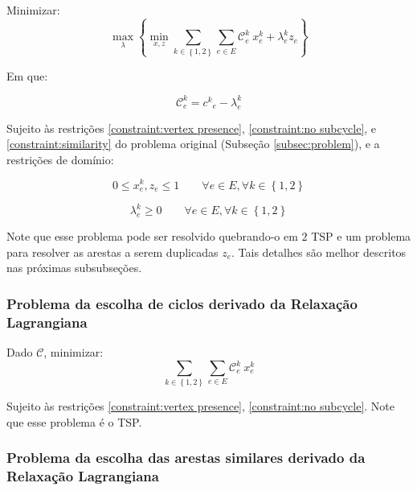 \documentclass{article}
\newcommand{\subsecref}[1]{(Subseção \ref{#1})}
\newcommand{\Set}[1]{\ensuremath{\left\{#1\right\}}}
\newcommand{\Sum}[1]{\ensuremath{\displaystyle\sum\limits_{#1}}}
\newcommand{\edge}{\ensuremath{e}}
\newcommand{\edges}{\ensuremath{E}}
\newcommand{\ncycles}{2}
\newcommand{\allCycles}{\ensuremath{\Set{1, \ncycles}}}
\newcommand{\cycle}{\ensuremath{k}}
\newcommand{\cost}[1]{\ensuremath{c^{#1}}}
\newcommand{\costke}{\ensuremath{\cost{\cycle}_{\edge}}}
\newcommand{\Cost}{\ensuremath{\mathcal{C}}}
\newcommand{\Costke}{\ensuremath{\Cost^{\cycle}_{\edge}}}
\newcommand{\X}{\ensuremath{x}}
\newcommand{\xke}{\ensuremath{\X^{\cycle}_{\edge}}}
\newcommand{\Z}{\ensuremath{z}}
\newcommand{\ze}{\ensuremath{\Z_{\edge}}}
\newcommand{\lagrange}{\ensuremath{\lambda}}
\newcommand{\lagrangeke}{\ensuremath{\lagrange_{\edge}^{\cycle}}}
\begin{document}
Minimizar:
\begin{equation}
    \label{eq:goal lagrangian}
	\max_{\lagrange}
	\left\{
		\min_{\X, \Z}
 		\Sum{\cycle \in \allCycles}
 		\Sum{\edge \in \edges}
 		\Costke \ \xke
 		+ \lagrangeke \ze
 	\right\}
\end{equation}

Em que:

\begin{equation}
	\Costke = \costke - \lagrangeke
\end{equation}

Sujeito às restrições \ref{constraint:vertex presence}, \ref{constraint:no subcycle}, e \ref{constraint:similarity} do problema original \subsecref{subsec:problem}, e a restrições de domínio:

\begin{equation}
	\label{constraint:value of variables}
	0 \leqslant \xke, \ze \leqslant 1
	\qquad
	\forall \edge \in \edges,
	\forall \cycle \in \allCycles
\end{equation}

\begin{equation}
	\label{constraint: lagrange}
	\lagrangeke \geqslant 0
	\qquad
	\forall \edge \in \edges,
	\forall \cycle \in \allCycles
\end{equation}

Note que esse problema pode ser resolvido quebrando-o em $\ncycles$ TSP e um problema para resolver as arestas a serem duplicadas $\ze$. Tais detalhes são melhor descritos nas próximas subsubseções.

\subsubsection{Problema da escolha de ciclos derivado da Relaxação Lagrangiana}

Dado $\Cost$, minimizar:
\begin{equation}
 	\Sum{\cycle \in \allCycles}
 	\Sum{\edge \in \edges}
 	\Costke \ \xke
\end{equation}

Sujeito às restrições \ref{constraint:vertex presence}, \ref{constraint:no subcycle}. Note que esse problema é o TSP.

\subsubsection{Problema da escolha das arestas similares derivado da Relaxação Lagrangiana}
\end{document}
